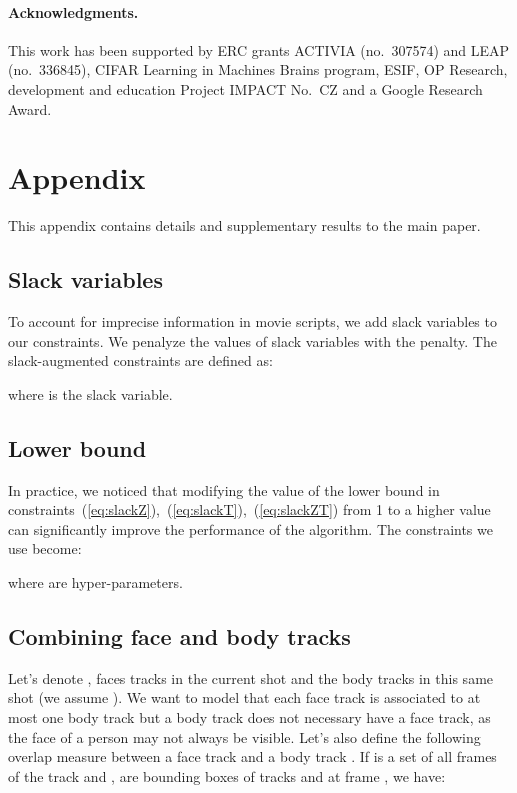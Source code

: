 \documentclass[10pt,twocolumn,letterpaper]{article}
\begin{document}
{\footnotesize \paragraph{Acknowledgments.} This work has been supported by ERC grants ACTIVIA (no.\
307574) and LEAP (no.\ 336845), CIFAR Learning in Machines  Brains
program, ESIF, OP Research, development and education Project IMPACT
No.\ CZ and a Google Research Award.}


{\small


}
\clearpage

\appendix

\section{Appendix}
This appendix contains details and supplementary results to the main paper.

\subsection{Slack variables}
\label{sec:slack}
To account for imprecise information in movie scripts, we add slack variables to our constraints.
We penalyze the values of slack variables with the  penalty. The slack-augmented constraints are defined as:

where  is the slack variable.

\subsection{Lower bound}
\label{sec:lowerbound}
In practice, we noticed that modifying the value of the lower bound in constraints~(\ref{eq:slackZ}),~(\ref{eq:slackT}),~(\ref{eq:slackZT}) from 1 to a higher value can significantly improve the performance of the algorithm. 
The constraints we use become:

where  are hyper-parameters. \\



\subsection{Combining face and body tracks}
\label{sec:tracks}


Let's denote ,  faces tracks in the current shot and  the  body tracks in this same shot (we assume ).
We want to model that each face track is associated to at most one body track but a body track does not necessary
have a face track, as the face of a person may not always be visible.
Let's also define the following overlap measure  between a face track  and a body track .
If  is a set of all frames of the track  and ,  are bounding boxes of tracks  and  at frame , we have: 
 
\end{document}
